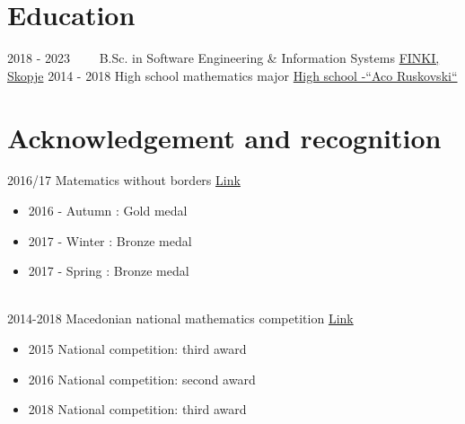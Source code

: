 \documentclass[letterpaper]{twentysecondcv} %
\begin{document}

\section{Education}

\begin{twenty} %
	\twentyitem
    	{2018 - 2023~~~~}
        {}
        {B.Sc. in Software Engineering \& Information Systems}
        {\href{https://www.finki.ukim.mk/en}{FINKI, Skopje}}
        {}
        {}
	\twentyitem
    	{2014 - 2018}
		{}
        {High school mathematics major}
        {\href{https://acoruskovski.edu.mk/}{High school -“Aco Ruskovski“}}
        {}
        {}
\end{twenty}

\newpage

\makesidebarSecond %


\section{Acknowledgement and recognition}
\begin{twenty} %
	\twentyitem
    		{2016/17}
		{}
        		{Matematics without borders}
        		{\href{https://mathwithoutborders.bg/public_html/en/}{Link}}
        		{}
        		{\begin{itemize}
        			\item 2016 - Autumn : Gold medal
                    \item 2017 - Winter : Bronze medal
                    \item 2017 - Spring : Bronze medal
        		\end{itemize}}\\
        	\twentyitem
    		{2014-2018}
		{}
        		{Macedonian national mathematics competition}
        		{\href{https://smm.org.mk/en/}{Link}}
        		{}
        		{\begin{itemize}
        			\item 2015 National competition: third award
                    \item 2016 National competition: second award
                    \item 2018 National competition: third award
        		\end{itemize}}
\end{twenty}
\end{document}
